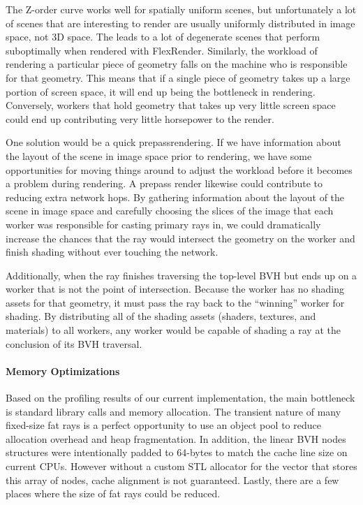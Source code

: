 \documentclass[a4paper,twoside]{article}
\begin{document}
The Z-order curve works well for spatially uniform scenes, but unfortunately a
lot of scenes that are interesting to render are usually uniformly distributed
in image space, not 3D space. The leads to a lot of degenerate scenes that
perform suboptimally when rendered with FlexRender. Similarly, the workload of rendering a 
particular piece of geometry falls on
the machine who is responsible for that geometry. This means that if a single
piece of geometry takes up a large portion of screen space, it will end up
being the bottleneck in rendering. Conversely, workers that hold geometry that
takes up very little screen space could end up contributing very little
horsepower to the render.

One solution would be a quick prepassrendering. If we have information about the
layout of the scene in image space prior to rendering, we have some opportunities
for moving things around to adjust the workload before it becomes a problem during
rendering. A prepass render likewise could contribute to reducing extra network hops.
By gathering information about the
layout of the scene in image space and carefully choosing the slices of the
image that each worker was responsible for casting primary rays in, we could
dramatically increase the chances that the ray would intersect the geometry
on the worker and finish shading without ever touching the network. 

Additionally, when the ray finishes
traversing the top-level BVH but ends up on a worker that is not the point of
intersection. Because the worker has no shading assets for that geometry, it
must pass the ray back to the ``winning'' worker for shading. By distributing
all of the shading assets (shaders, textures, and materials) to all workers,
any worker would be capable of shading a ray at the conclusion of its BVH traversal.

\paragraph{Memory Optimizations}
\label{memory}

Based on the profiling results of our current implementation, the main
bottleneck is standard library calls and memory allocation. The transient
nature of many fixed-size fat rays is a perfect opportunity to use an object
pool to reduce allocation overhead and heap fragmentation.
In addition, the linear BVH nodes structures were intentionally padded to
64-bytes to match the cache line size on current CPUs. However without a custom
STL allocator for the vector that stores this array of nodes, cache alignment
is not guaranteed. Lastly, there are a few places where the size of fat rays could be reduced.
\end{document}
